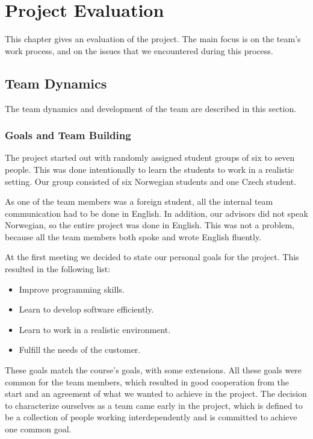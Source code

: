 \chapter{Project Evaluation}
This chapter gives an evaluation of the project. The main focus is on the team's work process, and on the issues that we encountered during this process.

\section{Team Dynamics}
The team dynamics and development of the team are described in this section.
\subsection{Goals and Team Building}
The project started out with randomly assigned student groups of six to seven people. This was done intentionally to learn the students to work in a realistic setting. Our group consisted of six Norwegian students and one Czech student. 

As one of the team members was a foreign student, all the internal team communication had to be done in English. In addition, our advisors did not speak Norwegian, so the entire project was done in English. This was not a problem, because all the team members both spoke and wrote English fluently.

At the first meeting we decided to state our personal goals for the project. This resulted in the following list:
\begin{itemize}
	\item Improve programming skills.
	\item Learn to develop software efficiently.
	\item Learn to work in a realistic environment.
	\item Fulfill the needs of the customer. 
\end{itemize}
These goals match the course's goals, with some extensions. All these goals were common for the team members, which resulted in good cooperation from the start and an agreement of what we wanted to achieve in the project. The decision to characterize ourselves as a team came early in the project, which is defined to be a collection of people working interdependently and is committed to achieve one common goal.

